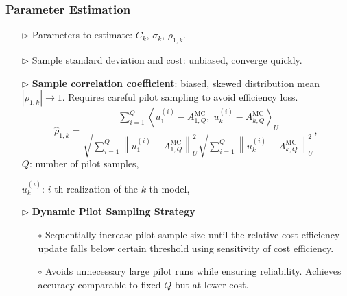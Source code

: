 \documentclass{beamer}
\begin{document}
\begin{frame}[t]
\frametitle{Parameter Estimation}
{\footnotesize
\begin{itemize}[leftmargin=5pt] 
\item[$\triangleright$] Parameters to estimate: $C_k$, $\sigma_k$, $\rho_{1,k}$.
\item[$\triangleright$] Sample standard deviation and cost: unbiased, converge quickly.
\item[$\triangleright$] \textcolor{myblue3}{\bf Sample correlation coefficient}: biased, skewed distribution mean $|\rho_{1,k}|\rightarrow 1$. Requires careful pilot sampling to avoid efficiency loss.
%
\[
\widehat{\rho}_{1,k} = \frac{\sum_{i=1}^Q\left\langle u_{1}^{(i)} - A_{1,Q}^{\text{MC}},\; u_{k}^{(i)} - A_{k,Q}^{\text{MC}} \right\rangle_U}{\sqrt{\sum_{i=1}^Q \left\|u_{1}^{(i)} - A_{1,Q}^{\text{MC}}\right\|_U^2} \sqrt{\sum_{i=1}^Q \left\|u_{k}^{(i)} - A_{k,Q}^{\text{MC}}\right\|_U^2}},
\]
%
$Q$: number of pilot samples,

$u_k^{(i)}$: $i$-th realization of the $k$-th model,

\item[$\triangleright$] \textcolor{myblue3}{\bf Dynamic Pilot Sampling Strategy}

\begin{itemize}[leftmargin=15pt] 
            \item[$\circ$] Sequentially increase pilot sample size until the relative cost efficiency update falls below certain threshold using sensitivity of cost efficiency.
            \item[$\circ$] Avoids unnecessary large pilot runs while ensuring reliability. Achieves accuracy comparable to fixed-$Q$ but at lower cost.
        \end{itemize}
\end{itemize}
}
\end{frame}
\end{document}
